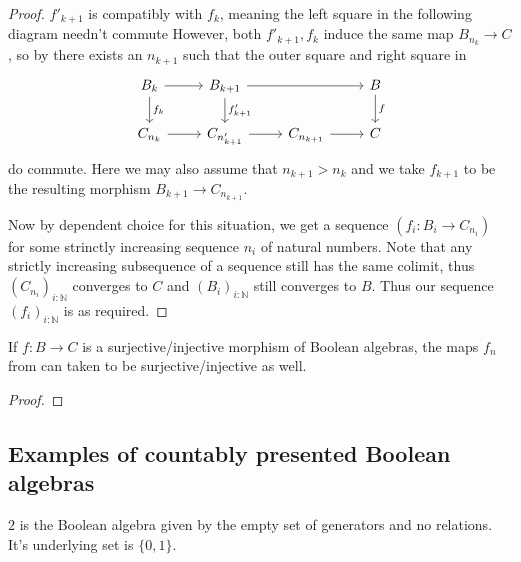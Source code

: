 \documentclass{../util/zariski-small}
\begin{document}
\begin{proof}
  $f'_{k+1}$ is compatibly with $f_k$, meaning the left square in the following diagram needn't commute 
  However, both $f'_{k+1}, f_k$ induce the same map $B_{n_k} \to C$, 
  so by  there exists an $n_{k+1}$ 
  such that the outer square and right square in 
  \begin{equation}
    \begin{tikzcd}
      B_{k} \arrow[r] \arrow[d, "f_k"]& B_{{k+1}} \arrow[rr] \arrow[d,"f'_{k+1}"]& & B \arrow[d,"f"] \\
      C_{n_k} \arrow[r] & C_{n'_{k+1}} \arrow[r] & C_{n_{k+1}} \arrow[r] & C 
    \end{tikzcd}
  \end{equation}
  do commute. 
  Here we may also assume that $n_{k+1}>n_k$ 
  and we take $f_{k+1}$ to be the resulting morphism $B_{k+1} \to C_{n_{k+1}}$. 

  Now by dependent choice for this situation, we get a sequence $(f_i:B_i \to C_{n_i})$  for some 
  strinctly increasing sequence $n_i$ of natural numbers. 
  Note that any strictly increasing subsequence of a sequence still has the same colimit, 
  thus $(C_{n_i})_{i:\mathbb N}$ converges to $C$ and $(B_i)_{i:\mathbb N}$ still converges to $B$. 
  Thus our sequence $(f_i)_{i:\mathbb N}$ is as required. 

\end{proof}
\begin{lemma}
  If $f:B \to C$ is a surjective/injective morphism of Boolean algebras, 
  the maps $f_n$ from  can taken to 
  be surjective/injective as well. 
\end{lemma}
\begin{proof}
\end{proof}

\subsection{Examples of countably presented Boolean algebras}
\begin{example}
  $2$ is the Boolean algebra given by the empty set of generators and no relations. 
    It's underlying set is $\{0,1\}$. 
\end{example}
\end{document}
